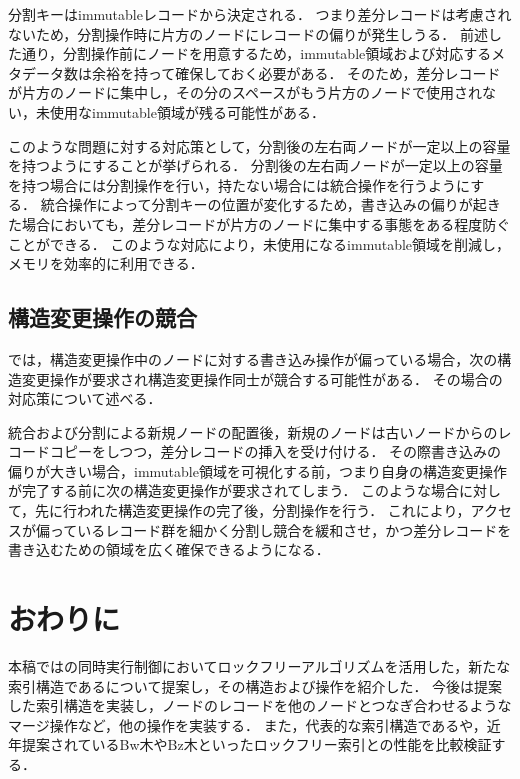 分割キーはimmutableレコードから決定される．
つまり差分レコードは考慮されないため，分割操作時に片方のノードにレコードの偏りが発生しうる．
前述した通り，分割操作前にノードを用意するため，immutable領域および対応するメタデータ数は余裕を持って確保しておく必要がある．
そのため，差分レコードが片方のノードに集中し，その分のスペースがもう片方のノードで使用されない，未使用なimmutable領域が残る可能性がある．

このような問題に対する対応策として，分割後の左右両ノードが一定以上の容量を持つようにすることが挙げられる．
分割後の左右両ノードが一定以上の容量を持つ場合には分割操作を行い，持たない場合には統合操作を行うようにする．
統合操作によって分割キーの位置が変化するため，書き込みの偏りが起きた場合においても，差分レコードが片方のノードに集中する事態をある程度防ぐことができる．
このような対応により，未使用になるimmutable領域を削減し，メモリを効率的に利用できる．

\subsection{構造変更操作の競合}

\Bctree{}では，構造変更操作中のノードに対する書き込み操作が偏っている場合，次の構造変更操作が要求され構造変更操作同士が競合する可能性がある．
その場合の対応策について述べる．

統合および分割による新規ノードの配置後，新規のノードは古いノードからのレコードコピーをしつつ，差分レコードの挿入を受け付ける．
その際書き込みの偏りが大きい場合，immutable領域を可視化する前，つまり自身の構造変更操作が完了する前に次の構造変更操作が要求されてしまう．
このような場合に対して，先に行われた構造変更操作の完了後，分割操作を行う．
これにより，アクセスが偏っているレコード群を細かく分割し競合を緩和させ，かつ差分レコードを書き込むための領域を広く確保できるようになる．

\section{おわりに}
\label{sec:conclusion}

本稿では\Bptree{}の同時実行制御においてロックフリーアルゴリズムを活用した，新たな索引構造である\Bctree{}について提案し，その構造および操作を紹介した．
今後は提案した索引構造を実装し，ノードのレコードを他のノードとつなぎ合わせるようなマージ操作など，他の操作を実装する．
また，代表的な索引構造である\Bptree{}や，近年提案されているBw木やBz木といったロックフリー索引との性能を比較検証する．